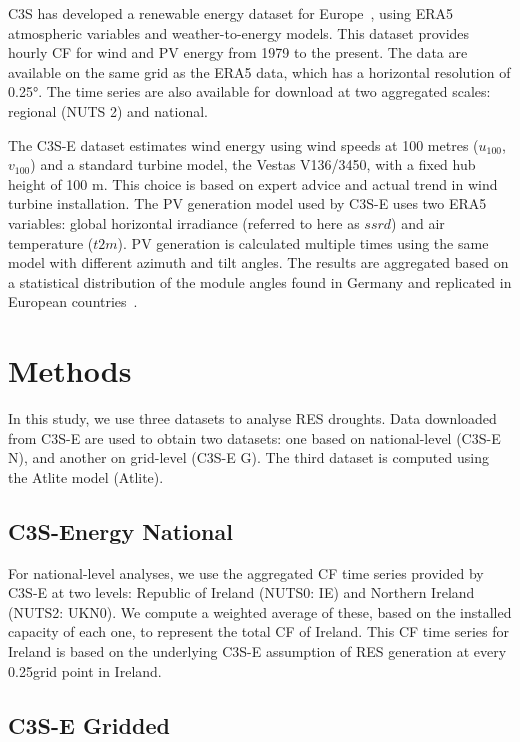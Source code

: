 \documentclass[a4paper, 11pt]{article}
\begin{document}
C3S has developed a renewable energy dataset for Europe~\cite{dubus2023energy}, using ERA5 atmospheric variables and weather-to-energy models. This dataset provides hourly CF for wind and PV energy from 1979 to the present. The data are available on the same grid as the ERA5 data, which has a horizontal resolution of 0.25°. The time series are also available for download at two aggregated scales: regional (NUTS 2) and national.

The C3S-E dataset estimates wind energy using wind speeds at 100 metres ($u_{100}$, $v_{100}$) and a standard turbine model, the Vestas V136/3450, with a fixed hub height of 100 m. This choice is based on expert advice and actual trend in wind turbine installation. The PV generation model used by C3S-E uses two ERA5 variables: global horizontal irradiance (referred to here as $ssrd$) and air temperature ($t2m$). PV generation is calculated multiple times using the same model with different azimuth and tilt angles. The results are aggregated based on a statistical distribution of the module angles found in Germany and replicated in European countries~\cite{saintdrenan2018solar}.

\section{Methods}
\label{sec:Methods}

In this study, we use three datasets to analyse RES droughts. Data downloaded from C3S-E are used to obtain two datasets: one based on national-level (C3S-E N), and another on grid-level (C3S-E G). The third dataset is computed using the Atlite model (Atlite).

\subsection{C3S-Energy National}
\label{sec:c3se_n}

For national-level analyses, we use the aggregated CF time series provided by C3S-E at two levels: Republic of Ireland (NUTS0: IE) and Northern Ireland (NUTS2: UKN0). We compute a weighted average of these, based on the installed capacity of each one, to represent the total CF of Ireland. This CF time series for Ireland is based on the underlying C3S-E assumption of RES generation at every 0.25\textdegree grid point in Ireland.

\subsection{C3S-E Gridded}
\label{sec:c3se_g}
\end{document}
